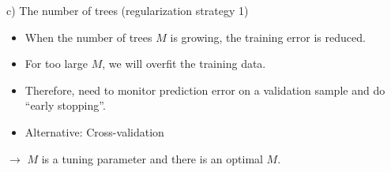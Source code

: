 \documentclass[
  10pt,
  ignorenonframetext,
]{beamer}
\providecommand{\tightlist}{%
  \setlength{\itemsep}{0pt}\setlength{\parskip}{0pt}}
\begin{document}
\begin{frame}
\begin{block}{c) The number of trees (regularization strategy 1)}
\protect\hypertarget{c-the-number-of-trees-regularization-strategy-1}{}
\(~\)

\begin{itemize}
\tightlist
\item
  When the number of trees \(M\) is growing, the training error is
  reduced.
\end{itemize}

\vspace{2mm}

\begin{itemize}
\tightlist
\item
  For too large \(M\), we will overfit the training data.
\end{itemize}

\vspace{2mm}

\begin{itemize}
\tightlist
\item
  Therefore, need to monitor prediction error on a validation sample and
  do ``early stopping''.
\end{itemize}

\vspace{2mm}

\begin{itemize}
\tightlist
\item
  Alternative: Cross-validation
\end{itemize}

\vspace{6mm}

\(\rightarrow\) \(M\) is a tuning parameter and there is an optimal
\(M\).
\end{block}
\end{frame}
\end{document}
